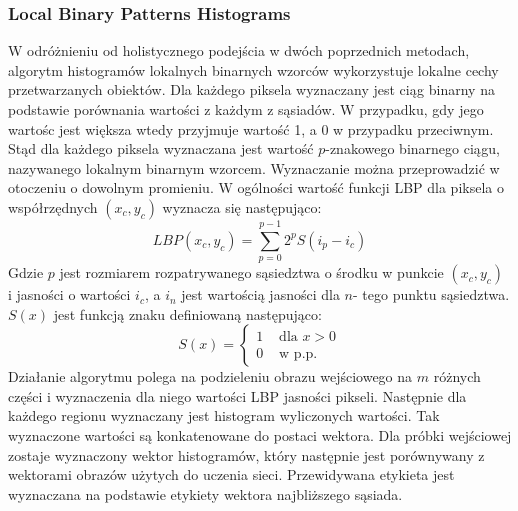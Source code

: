 \subsubsection{Local Binary Patterns Histograms} \label{lbph}
W odróżnieniu od holistycznego podejścia w dwóch poprzednich metodach, algorytm histogramów lokalnych binarnych wzorców wykorzystuje lokalne cechy przetwarzanych obiektów.
Dla każdego piksela wyznaczany jest ciąg binarny na podstawie porównania wartości z każdym z sąsiadów. W przypadku, gdy jego wartośc jest większa wtedy przyjmuje wartość 1, a 0 w przypadku przeciwnym. Stąd dla każdego piksela wyznaczana jest wartość $p$-znakowego binarnego ciągu, nazywanego lokalnym binarnym wzorcem.  Wyznaczanie można przeprowadzić w otoczeniu o dowolnym promieniu. W ogólności wartość funkcji LBP dla piksela o współrzędnych $(x_{c},y_{c})$ wyznacza się następująco: 
$$
LBP(x_{c},y_{c})=\sum_{p=0}^{p-1}2^{p}S(i_{p}-i_{c})
$$
Gdzie $p$ jest rozmiarem rozpatrywanego sąsiedztwa o środku w punkcie $(x_{c},y_{c})$ i jasności o wartości $i_{c}$, a $i_{n}$ jest wartością jasności dla $n$- tego punktu sąsiedztwa.
$S(x)$ jest funkcją znaku definiowaną następująco:
$$
S(x) = \left\{ \begin{array}{ll}
1 & \textrm{ dla $x>0$}\\
0 & \textrm{ w p.p.}
\end{array} \right.
$$
Działanie algorytmu polega na podzieleniu obrazu wejściowego na $m$ różnych części i wyznaczenia dla niego wartości LBP jasności pikseli. Następnie dla każdego regionu wyznaczany jest histogram wyliczonych wartości. Tak wyznaczone wartości są konkatenowane do postaci wektora.
Dla próbki wejściowej zostaje wyznaczony wektor histogramów, który następnie jest porównywany z wektorami obrazów użytych do uczenia sieci. Przewidywana etykieta jest wyznaczana na podstawie etykiety wektora najbliższego sąsiada.

